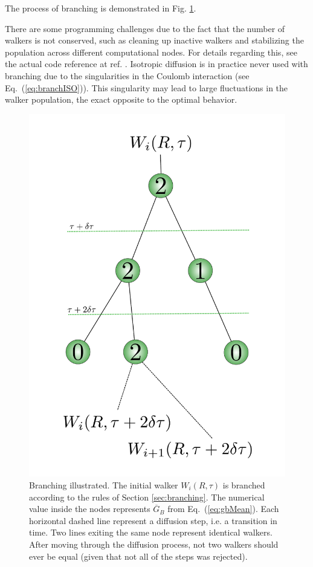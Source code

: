 The process of branching is demonstrated in Fig. \ref{fig:branching}.

There are some programming challenges due to the fact that the number of walkers is not conserved, such as cleaning up inactive walkers and stabilizing the population across different computational nodes. For details regarding this, see the actual code reference at ref. \cite{libBorealisCode}. Isotropic diffusion is in practice never used with branching due to the singularities in the Coulomb interaction (see Eq.~(\ref{eq:branchISO})). This singularity may lead to large fluctuations in the walker population, the exact opposite to the optimal behavior.

\begin{figure}
 \begin{center}
  \includegraphics[scale=0.5]{../Graphics/branching.pdf}
  \caption{Branching illustrated. The initial walker $W_i(R, \tau)$ is branched according to the rules of Section \ref{sec:branching}. The numerical value inside the nodes represents $\overline{G}_B$ from Eq.~(\ref{eq:gbMean}). Each horizontal dashed line represent a diffusion step, i.e. a transition in time. Two lines exiting the same node represent identical walkers. After moving through the diffusion process, not two walkers should ever be equal (given that not all of the steps was rejected).}
  \label{fig:branching}
 \end{center}
\end{figure}
\clearpage

